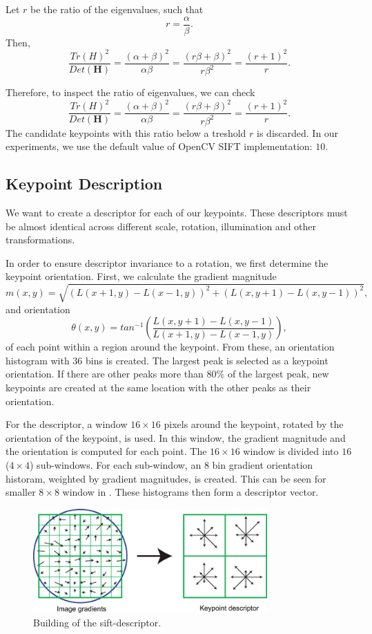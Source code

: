 Let $r$ be the ratio of the eigenvalues, such that
\begin{equation}
    r=\frac{\alpha}{\beta}.
\end{equation}
Then,
\begin{equation}
    \frac{Tr(H)^2}{Det(\boldsymbol{H})} = \frac{(\alpha+\beta)^2}{\alpha\beta}=\frac{(r\beta+\beta)^2}{r\beta^2} = \frac{(r+1)^2}{r}.
\end{equation}

Therefore, to inspect the ratio of eigenvalues, we can check
\begin{equation}
    \frac{Tr(H)^2}{Det(\boldsymbol{H})} = \frac{(\alpha+\beta)^2}{\alpha\beta}=\frac{(r\beta+\beta)^2}{r\beta^2} = \frac{(r+1)^2}{r}.
\end{equation}
The candidate keypoints with this ratio below a treshold $r$ is discarded. In our experiments, we use the default value of OpenCV SIFT implementation: $10$.

\subsection{Keypoint Description}
We want to create a descriptor for each of our keypoints. These descriptors must be almost identical across different scale, rotation, illumination and other transformations.

In order to ensure descriptor invariance to a rotation, we first determine the keypoint orientation. First, we calculate the gradient magnitude
\begin{equation}
    m(x,y) = \sqrt{(L(x+1,y)-L(x-1,y))^2+(L(x,y+1)-L(x,y-1))^2},
\end{equation}
and orientation
\begin{equation}
    \theta(x,y) = tan^{-1}\left(\frac{L(x,y+1)-L(x,y-1)}{L(x+1,y)-L(x-1,y)}\right),
\end{equation}
of each point within a region around the keypoint. From these, an orientation histogram with $36$ bins is created. The largest peak is selected as a keypoint orientation. If there are other peaks more than $80\%$ of the largest peak, new keypoints are created at the same location with the other peaks as their orientation.

For the descriptor, a window $16\times16$ pixels around the keypoint, rotated by the orientation of the keypoint, is used. In this window, the gradient magnitude and the orientation is computed for each point. The $16\times16$ window is divided into $16$ ($4\times4$) sub-windows. For each sub-window, an $8$ bin gradient orientation historam, weighted by gradient magnitudes, is created. This can be seen for smaller $8\times8$ window in . These histograms then form a descriptor vector.

\begin{figure}
    \centering
    \includegraphics[width=0.8\textwidth]{Figures/sift/descriptor.jpg}
    \caption[Extracting the sift-descriptor.]{Building of the sift-descriptor. \cite{Lowe2004}}
    \label{fig:sift_descriptor}
\end{figure}
